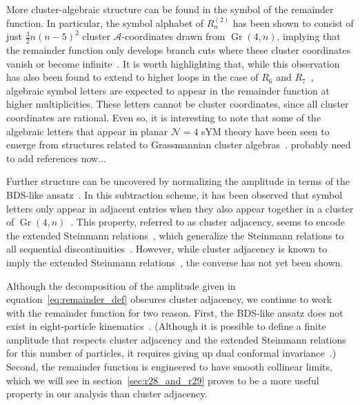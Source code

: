\documentclass[11pt]{article}
\DeclareMathOperator{\Gr}{Gr}
\begin{document}
More cluster-algebraic structure can be found in the symbol of the remainder function. In particular, the symbol alphabet of $R_n^{(2)}$\! has been shown to consist of just $\frac{3}{2} n (n - 5)^2$ cluster $\mathcal{A}$-coordinates drawn from $\Gr(4,n)$, implying that the remainder function only develops branch cuts where these cluster coordinates vanish or become infinite~\cite{Golden:2013xva}. It is worth highlighting that, while this observation has also been found to extend to higher loops in the case of $R_6$ and $R_7$~\cite{Caron-Huot:2020bkp,Prlina:2018ukf}, algebraic symbol letters are expected to appear in the remainder function at higher multiplicities. These letters cannot be cluster coordinates, since all cluster coordinates are rational. Even so, it is interesting to note that some of the algebraic letters that appear in planar $\mathcal{N}=4$ sYM theory have been seen to emerge from structures related to Grassmannian cluster algebras~\cite{Drummond:2019cxm,Arkani-Hamed:2019rds,Henke:2019hve,Drummond:2020kqg,Mago:2020kmp,He:2020uhb}. {\color{red} probably need to add references now...}


Further structure can be uncovered by normalizing the amplitude in terms of the BDS-like ansatz~\cite{Alday:2009dv,Yang:2010as}. In this subtraction scheme, it has been observed that symbol letters only appear in adjacent entries when they also appear together in a cluster of $\Gr(4,n)$~\cite{Drummond:2017ssj}. This property, referred to as cluster adjacency, seems to encode the extended Steinmann relations~\cite{Caron-Huot:2018dsv,Caron-Huot:2019bsq}, which generalize the Steinmann relations to all sequential discontinuities~\cite{Steinmann,Steinmann2,Cahill:1973qp}. However, while cluster adjacency is known to imply the extended Steinmann relations~\cite{Golden:2019kks}, the converse has not yet been shown.


Although the decomposition of the amplitude given in equation~\eqref{eq:remainder_def} obscures cluster adjacency, we continue to work with the remainder function for two reason. First, the BDS-like ansatz does not exist in eight-particle kinematics~\cite{Yang:2010as}. (Although it is possible to define a finite amplitude that respects cluster adjacency and the extended Steinmann relations for this number of particles, it requires giving up dual conformal invariance~\cite{Golden:2018gtk}.) Second, the remainder function is engineered to have smooth collinear limits, which we will see in section~\ref{sec:r28_and_r29} proves to be a more useful property in our analysis than cluster adjacency. 
\end{document}

